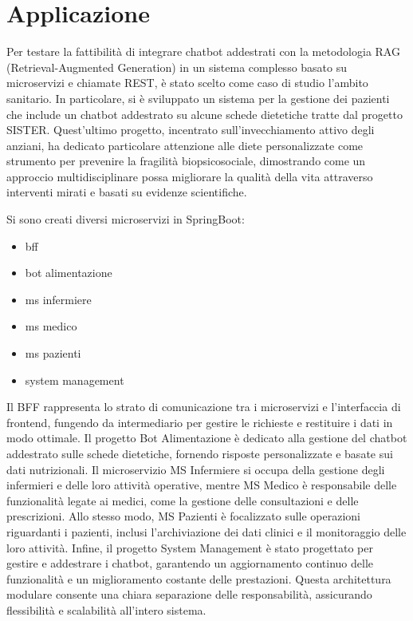 \documentclass[a4paper,twoside,12pt]{toptesi}
\begin{document}
\section{Applicazione}

Per testare la fattibilità di integrare chatbot addestrati con la metodologia RAG (Retrieval-Augmented Generation) in un sistema complesso basato su microservizi e chiamate REST, è stato scelto come caso di studio l'ambito sanitario. In particolare, si è sviluppato un sistema per la gestione dei pazienti che include un chatbot addestrato su alcune schede dietetiche tratte dal progetto SISTER. Quest'ultimo progetto, incentrato sull'invecchiamento attivo degli anziani, ha dedicato particolare attenzione alle diete personalizzate come strumento per prevenire la fragilità biopsicosociale, dimostrando come un approccio multidisciplinare possa migliorare la qualità della vita attraverso interventi mirati e basati su evidenze scientifiche.




Si sono creati diversi microservizi in SpringBoot:
\begin{itemize}
\item bff
\item bot alimentazione
\item ms infermiere
\item ms medico
\item ms pazienti
\item system management
\end{itemize}

Il BFF rappresenta lo strato di comunicazione tra i microservizi e l'interfaccia di frontend, fungendo da intermediario per gestire le richieste e restituire i dati in modo ottimale. Il progetto Bot Alimentazione è dedicato alla gestione del chatbot addestrato sulle schede dietetiche, fornendo risposte personalizzate e basate sui dati nutrizionali. Il microservizio MS Infermiere si occupa della gestione degli infermieri e delle loro attività operative, mentre MS Medico è responsabile delle funzionalità legate ai medici, come la gestione delle consultazioni e delle prescrizioni. Allo stesso modo, MS Pazienti è focalizzato sulle operazioni riguardanti i pazienti, inclusi l'archiviazione dei dati clinici e il monitoraggio delle loro attività. Infine, il progetto System Management è stato progettato per gestire e addestrare i chatbot, garantendo un aggiornamento continuo delle funzionalità e un miglioramento costante delle prestazioni. Questa architettura modulare consente una chiara separazione delle responsabilità, assicurando flessibilità e scalabilità all’intero sistema.
\end{document}
